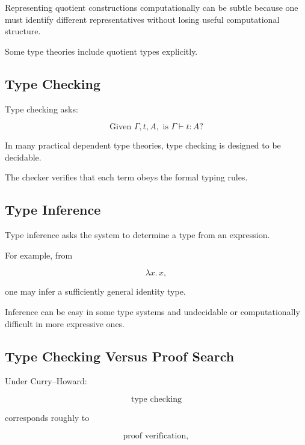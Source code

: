 Representing quotient constructions computationally can be subtle because
one must identify different representatives without losing useful
computational structure.

Some type theories include quotient types explicitly.

\subsection{Type Checking}
\label{subsec:type-checking}

Type checking asks:

\[
\boxed{
\text{Given }\Gamma,t,A,
\text{ is }
\Gamma\vdash t:A?
}
\]

In many practical dependent type theories, type checking is designed to be
decidable.

The checker verifies that each term obeys the formal typing rules.

\subsection{Type Inference}
\label{subsec:type-inference}

Type inference asks the system to determine a type from an expression.

For example, from

\[
\lambda x.\,x,
\]

one may infer a sufficiently general identity type.

Inference can be easy in some type systems and undecidable or
computationally difficult in more expressive ones.

\subsection{Type Checking Versus Proof Search}
\label{subsec:type-checking-proof-search}

Under Curry--Howard:

\[
\boxed{
\text{type checking}
}
\]

corresponds roughly to

\[
\boxed{
\text{proof verification},
}
\]

